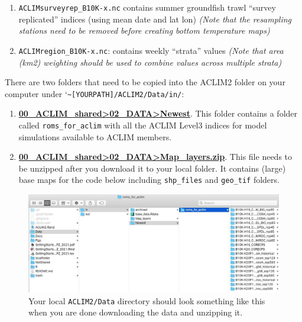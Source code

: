\documentclass[
]{article}
\providecommand{\tightlist}{%
  \setlength{\itemsep}{0pt}\setlength{\parskip}{0pt}}
\begin{document}
\begin{enumerate}
\def\labelenumi{\arabic{enumi})}
\tightlist
\item
  \texttt{ACLIMsurveyrep\_B10K-x.nc} contains summer groundfish trawl
  ``survey replicated'' indices (using mean date and lat lon)
  \emph{(Note that the resampling stations need to be removed before
  creating bottom temperature maps)}\\
\item
  \texttt{ACLIMregion\_B10K-x.nc}: contains weekly ``strata'' values
  \emph{(Note that area (km2) weighting should be used to combine values
  across multiple strata)}
\end{enumerate}

There are two folders that need to be copied into the ACLIM2 folder on
your computer under
`\texttt{\textasciitilde{}{[}YOURPATH{]}/ACLIM2/Data/in/}:

\begin{enumerate}
\def\labelenumi{\arabic{enumi})}
\item
  \href{https://drive.google.com/drive/u/0/folders/0Bx7wdZllbuF9eDJndkhCS2EwQUk}{\textbf{00\_ACLIM\_shared\textgreater02\_DATA\textgreater Newest}}.
  This folder contains a folder called \texttt{roms\_for\_aclim} with
  all the ACLIM Level3 indices for model simulations available to ACLIM
  members.
\item
  \href{https://drive.google.com/drive/u/0/folders/0Bx7wdZllbuF9eDJndkhCS2EwQUk}{\textbf{00\_ACLIM\_shared\textgreater02\_DATA\textgreater Map\_layers.zip}}.
  This file needs to be unzipped after you download it to your local
  folder. It contains (large) base maps for the code below including
  \texttt{shp\_files} and \texttt{geo\_tif} folders.
\end{enumerate}

\begin{figure}
\centering
\includegraphics[width=1\textwidth,height=\textheight]{Figs/data_dir.jpg}
\caption{Your local \texttt{ACLIM2/Data} directory should look something
like this when you are done downloading the data and unzipping it.}
\end{figure}
\end{document}
